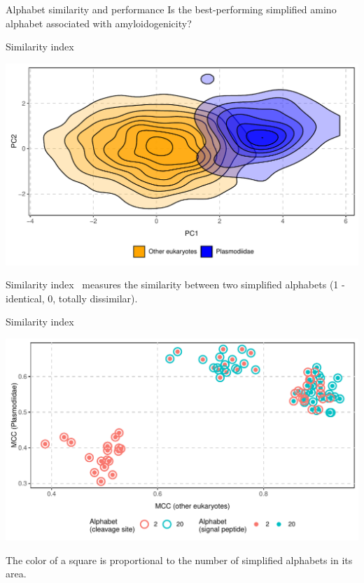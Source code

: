 \documentclass{beamer}\usepackage[]{graphicx}\usepackage[]{color}
\makeatletter
\def\maxwidth{ %
  \ifdim\Gin@nat@width>\linewidth
    \linewidth
  \else
    \Gin@nat@width
  \fi
}
\newenvironment{knitrout}{}{} %
\makeatother
\begin{document}
\begin{frame}{Alphabet similarity and performance}
Is the best-performing simplified amino alphabet associated with amyloidogenicity?
\end{frame}

\begin{frame}{Similarity index}
\begin{knitrout}
\color{fgcolor}

{\centering \includegraphics[width=\maxwidth]{figure/unnamed-chunk-15-1} 

}



\end{knitrout}
Similarity index~\citep{stephenson_unearthing_2013} measures the similarity between two simplified alphabets (1 - identical, 0, totally dissimilar).
\end{frame}



\begin{frame}{Similarity index}
\begin{knitrout}
\color{fgcolor}

{\centering \includegraphics[width=\maxwidth]{figure/unnamed-chunk-16-1} 

}



\end{knitrout}
The color of a square is proportional to the number of simplified alphabets in its area.
\end{frame}
\end{document}
